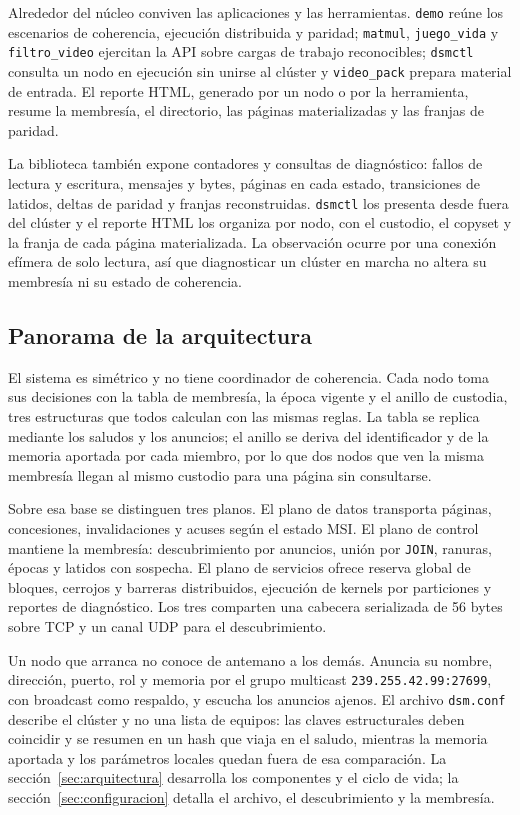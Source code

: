 Alrededor del núcleo conviven las aplicaciones y las herramientas. \texttt{demo} reúne los escenarios de coherencia, ejecución distribuida y paridad; \texttt{matmul}, \texttt{juego\_vida} y \texttt{filtro\_video} ejercitan la API sobre cargas de trabajo reconocibles; \texttt{dsmctl} consulta un nodo en ejecución sin unirse al clúster y \texttt{video\_pack} prepara material de entrada. El reporte HTML, generado por un nodo o por la herramienta, resume la membresía, el directorio, las páginas materializadas y las franjas de paridad.

La biblioteca también expone contadores y consultas de diagnóstico: fallos de lectura y escritura, mensajes y bytes, páginas en cada estado, transiciones de latidos, deltas de paridad y franjas reconstruidas. \texttt{dsmctl} los presenta desde fuera del clúster y el reporte HTML los organiza por nodo, con el custodio, el copyset y la franja de cada página materializada. La observación ocurre por una conexión efímera de solo lectura, así que diagnosticar un clúster en marcha no altera su membresía ni su estado de coherencia.

\subsection{Panorama de la arquitectura}

El sistema es simétrico y no tiene coordinador de coherencia. Cada nodo toma sus decisiones con la tabla de membresía, la época vigente y el anillo de custodia, tres estructuras que todos calculan con las mismas reglas. La tabla se replica mediante los saludos y los anuncios; el anillo se deriva del identificador y de la memoria aportada por cada miembro, por lo que dos nodos que ven la misma membresía llegan al mismo custodio para una página sin consultarse.

Sobre esa base se distinguen tres planos. El plano de datos transporta páginas, concesiones, invalidaciones y acuses según el estado MSI. El plano de control mantiene la membresía: descubrimiento por anuncios, unión por \texttt{JOIN}, ranuras, épocas y latidos con sospecha. El plano de servicios ofrece reserva global de bloques, cerrojos y barreras distribuidos, ejecución de kernels por particiones y reportes de diagnóstico. Los tres comparten una cabecera serializada de 56 bytes sobre TCP y un canal UDP para el descubrimiento.

Un nodo que arranca no conoce de antemano a los demás. Anuncia su nombre, dirección, puerto, rol y memoria por el grupo multicast \texttt{239.255.42.99:27699}, con broadcast como respaldo, y escucha los anuncios ajenos. El archivo \texttt{dsm.conf} describe el clúster y no una lista de equipos: las claves estructurales deben coincidir y se resumen en un hash que viaja en el saludo, mientras la memoria aportada y los parámetros locales quedan fuera de esa comparación. La sección~\ref{sec:arquitectura} desarrolla los componentes y el ciclo de vida; la sección~\ref{sec:configuracion} detalla el archivo, el descubrimiento y la membresía.

